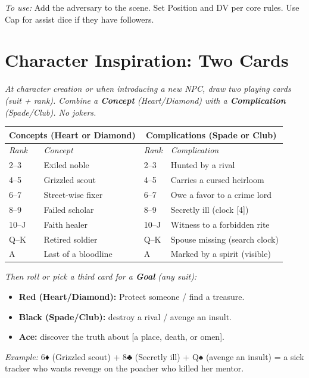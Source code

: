 \documentclass[10pt,twocolumn]{article}
\begin{document}
\textit{To use:} Add the adversary to the scene. Set Position and DV per core rules. Use Cap for assist dice if they have followers.

\section*{Character Inspiration: Two Cards}
\textit{At character creation or when introducing a new NPC, draw two playing cards (suit + rank). Combine a \textbf{Concept} (Heart/Diamond) with a \textbf{Complication} (Spade/Club). No jokers.}

\begin{tabular}{@{}p{}p{}p{}p{}}
\toprule
\multicolumn{2}{c}{\textbf{Concepts (Heart or Diamond)}} &
\multicolumn{2}{c}{\textbf{Complications (Spade or Club)}} \\
\midrule
\emph{Rank} & \emph{Concept} & \emph{Rank} & \emph{Complication} \\
2--3 & Exiled noble & 2--3 & Hunted by a rival \\
4--5 & Grizzled scout & 4--5 & Carries a cursed heirloom \\
6--7 & Street-wise fixer & 6--7 & Owe a favor to a crime lord \\
8--9 & Failed scholar & 8--9 & Secretly ill (clock [4]) \\
10--J & Faith healer & 10--J & Witness to a forbidden rite \\
Q--K & Retired soldier & Q--K & Spouse missing (search clock) \\
A & Last of a bloodline & A & Marked by a spirit (visible) \\
\bottomrule
\end{tabular}

\textit{Then roll or pick a third card for a \textbf{Goal} (any suit):}
\begin{itemize}
    \item \textbf{Red (Heart/Diamond):} Protect someone / find a treasure.
    \item \textbf{Black (Spade/Club):} destroy a rival / avenge an insult.
    \item \textbf{Ace:} discover the truth about [a place, death, or omen].
\end{itemize}

\textit{Example:} 6♦ (Grizzled scout) + 8♣ (Secretly ill) + Q♠ (avenge an insult) = a sick tracker who wants revenge on the poacher who killed her mentor.
\end{document}
